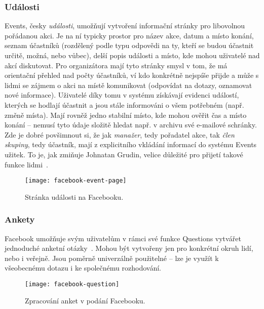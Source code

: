 \documentclass[12pt,oneside,final]{fithesis2}
\begin{document}
\subsubsection*{Události}
Events, česky \emph{události}, umožňují vytvoření informační stránky pro libovolnou pořádanou akci. Je na ní typicky prostor pro název akce, datum a místo konání, seznam účastníků (rozdělený podle typu odpovědi na ty, kteří se budou účastnit určitě, možná, nebo vůbec), delší popis události a místo, kde mohou uživatelé nad akcí diskutovat. Pro organizátora mají tyto stránky smysl v tom, že má orientační přehled nad počty účastníků, ví kdo konkrétně nejspíše přijde a může s lidmi se zájmem o akci na místě komunikovat (odpovídat na dotazy, oznamovat nové informace). Uživatelé díky tomu v systému získávají evidenci událostí, kterých se hodlají účastnit a jsou stále informováni o všem potřebném (např. změně místa). Mají rovněž jedno stabilní místo, kde mohou ověřit čas a místo konání -- nemusí tyto údaje složitě hledat např. v archivu své e-mailové schránky. Zde je dobré povšimnout si, že jak \emph{manažer}, tedy pořadatel akce, tak \emph{člen skupiny}, tedy účastník, mají z explicitního vkládání informací do systému Events užitek. To je, jak zmiňuje Johnatan Grudin, velice důležité pro přijetí takové funkce lidmi~\cite{grudin1994groupware}.

\begin{figure}[H]
    \texttt{[image: facebook-event-page]}
    \caption{Stránka události na Facebooku.}
\end{figure}

\subsubsection*{Ankety}
Facebook umožňuje svým uživatelům v rámci své funkce Questions vytvářet jednoduché anketní otázky~\cite{graham2011the}. Mohou být vytvořeny jen pro konkrétní okruh lidí, nebo i veřejně. Jsou poměrně univerzálně použitelné -- lze je využít k všeobecnému dotazu i ke společnému rozhodování.

\begin{figure}[H]
    \texttt{[image: facebook-question]}
    \caption{Zpracování anket v podání Facebooku.}
\end{figure}
\end{document}
